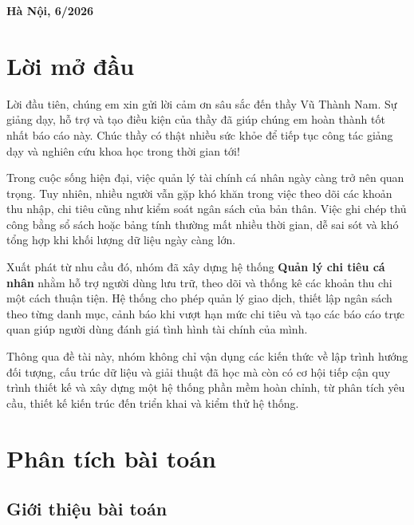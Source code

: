 \documentclass[12pt,letterpaper]{article}
\begin{document}
\begin{titlepage}

\begin{center}
    \vfill
    \large \textbf{Hà Nội, 6/2026}
\end{center}

\vspace{1cm}

\end{titlepage}
\newpage
\tableofcontents

\newpage
\section{Lời mở đầu}
Lời đầu tiên, chúng em xin gửi lời cảm ơn sâu sắc đến thầy Vũ Thành Nam. Sự giảng dạy, hỗ trợ và tạo điều kiện của thầy đã giúp chúng em hoàn thành tốt nhất báo cáo này. Chúc thầy có thật nhiều sức khỏe để tiếp tục công tác giảng dạy và nghiên cứu khoa học trong thời gian tới! 

Trong cuộc sống hiện đại, việc quản lý tài chính cá nhân ngày càng trở nên quan trọng. Tuy nhiên, nhiều người vẫn gặp khó khăn trong việc theo dõi các khoản thu nhập, chi tiêu cũng như kiểm soát ngân sách của bản thân. Việc ghi chép thủ công bằng sổ sách hoặc bảng tính thường mất nhiều thời gian, dễ sai sót và khó tổng hợp khi khối lượng dữ liệu ngày càng lớn.

Xuất phát từ nhu cầu đó, nhóm đã xây dựng hệ thống \textbf{Quản lý chi tiêu cá nhân} nhằm hỗ trợ người dùng lưu trữ, theo dõi và thống kê các khoản thu chi một cách thuận tiện. Hệ thống cho phép quản lý giao dịch, thiết lập ngân sách theo từng danh mục, cảnh báo khi vượt hạn mức chi tiêu và tạo các báo cáo trực quan giúp người dùng đánh giá tình hình tài chính của mình.

Thông qua đề tài này, nhóm không chỉ vận dụng các kiến thức về lập trình hướng đối tượng, cấu trúc dữ liệu và giải thuật đã học mà còn có cơ hội tiếp cận quy trình thiết kế và xây dựng một hệ thống phần mềm hoàn chỉnh, từ phân tích yêu cầu, thiết kế kiến trúc đến triển khai và kiểm thử hệ thống.
\setcounter{page}{1}

\newpage
\section{Phân tích  bài toán}
\subsection{Giới thiệu bài toán}
\end{document}
